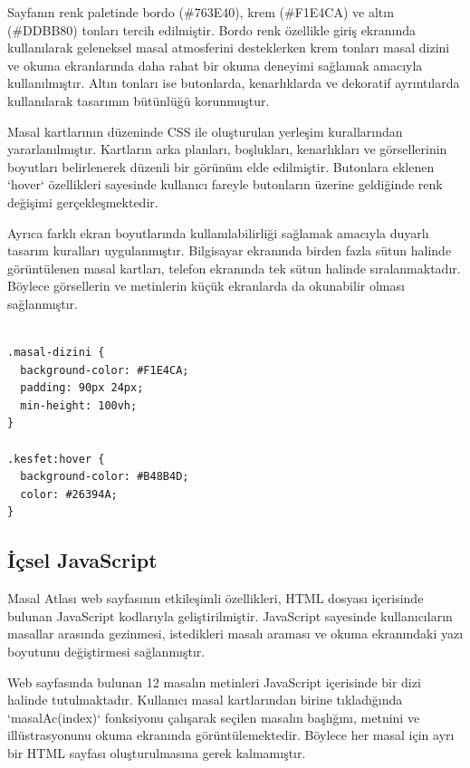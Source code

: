 \documentclass[12pt,a4paper]{article}
\begin{document}
Sayfanın renk paletinde bordo (\#763E40), krem (\#F1E4CA) ve altın (\#DDBB80) tonları tercih edilmiştir. Bordo renk özellikle giriş ekranında kullanılarak geleneksel masal atmosferini desteklerken krem tonları masal dizini ve okuma ekranlarında daha rahat bir okuma deneyimi sağlamak amacıyla kullanılmıştır. Altın tonları ise butonlarda, kenarlıklarda ve dekoratif ayrıntılarda kullanılarak tasarımın bütünlüğü korunmuştur.

Masal kartlarının düzeninde CSS ile oluşturulan yerleşim kurallarından yararlanılmıştır. Kartların arka planları, boşlukları, kenarlıkları ve görsellerinin boyutları belirlenerek düzenli bir görünüm elde edilmiştir. Butonlara eklenen `hover` özellikleri sayesinde kullanıcı fareyle butonların üzerine geldiğinde renk değişimi gerçekleşmektedir.

Ayrıca farklı ekran boyutlarında kullanılabilirliği sağlamak amacıyla duyarlı tasarım kuralları uygulanmıştır. Bilgisayar ekranında birden fazla sütun halinde görüntülenen masal kartları, telefon ekranında tek sütun halinde sıralanmaktadır. Böylece görsellerin ve metinlerin küçük ekranlarda da okunabilir olması sağlanmıştır.

\begin{lstlisting}[caption={İçsel CSS'ten önemli bir bölüm}]

.masal-dizini {
  background-color: #F1E4CA;
  padding: 90px 24px;
  min-height: 100vh;
}

.kesfet:hover {
  background-color: #B48B4D;
  color: #26394A;
}

\end{lstlisting}

\subsection{İçsel JavaScript}
Masal Atlası web sayfasının etkileşimli özellikleri, HTML dosyası içerisinde bulunan JavaScript kodlarıyla geliştirilmiştir. JavaScript sayesinde kullanıcıların masallar arasında gezinmesi, istedikleri masalı araması ve okuma ekranındaki yazı boyutunu değiştirmesi sağlanmıştır.

Web sayfasında bulunan 12 masalın metinleri JavaScript içerisinde bir dizi halinde tutulmaktadır. Kullanıcı masal kartlarından birine tıkladığında `masalAc(index)` fonksiyonu çalışarak seçilen masalın başlığını, metnini ve illüstrasyonunu okuma ekranında görüntülemektedir. Böylece her masal için ayrı bir HTML sayfası oluşturulmasına gerek kalmamıştır.
\end{document}
